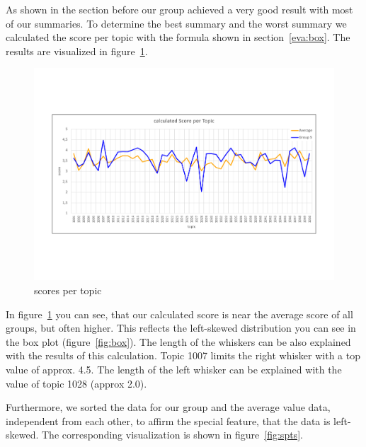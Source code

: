 As shown in the section before our group achieved a very good result with most of our summaries.
To determine the best summary and the worst summary we calculated the score per topic with the formula shown in section~\ref{eva:box}. The results are visualized in figure~\ref{fig:spt}.

\begin{figure}[H]
	\centering
	\includegraphics[trim=0 150 0 150, width=\textwidth]{img/score_per_topic.pdf}
	\caption{scores per topic}
	\label{fig:spt}
\end{figure}

In figure~\ref{fig:spt} you can see, that our calculated score is near the average score of all groups, but often higher. This reflects the left-skewed distribution you can see in the box plot (figure~\ref{fig:box}).
The length of the whiskers can be also explained with the results of this calculation.
Topic 1007 limits the right whisker with a top value of approx. 4.5.
The length of the left whisker can be explained with the value of topic 1028 (approx 2.0).

Furthermore, we sorted the data for our group and the average value data, independent from each other, to affirm the special feature, that the data is left-skewed. The corresponding visualization is shown in figure~\ref{fig:spts}.

